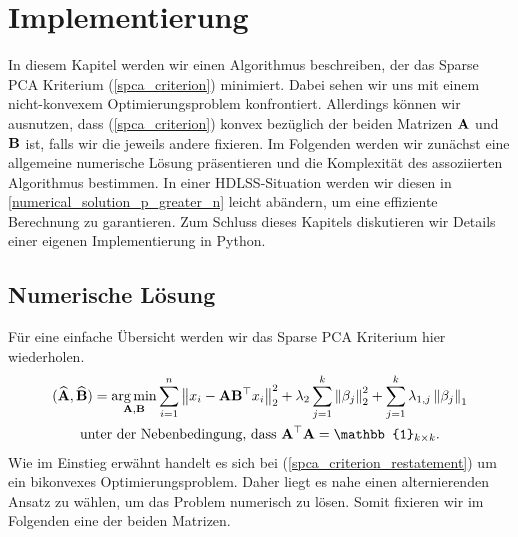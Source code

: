 \chapter{Implementierung}

\label{implementation}

In diesem Kapitel werden wir einen Algorithmus beschreiben, der das Sparse PCA Kriterium (\ref{spca_criterion}) minimiert. Dabei sehen wir uns mit einem nicht-konvexem Optimierungsproblem konfrontiert. Allerdings können wir ausnutzen, dass (\ref{spca_criterion}) konvex bezüglich der beiden Matrizen $\mathbf{A}$ und $\mathbf{B}$ ist, falls wir die jeweils andere fixieren. Im Folgenden werden wir zunächst eine allgemeine numerische Lösung präsentieren und die Komplexität des assoziierten Algorithmus bestimmen. In einer HDLSS-Situation werden wir diesen in \ref{numerical_solution_p_greater_n} leicht abändern, um eine effiziente Berechnung zu garantieren. Zum Schluss dieses Kapitels diskutieren wir Details einer eigenen Implementierung in Python.




\section{Numerische Lösung}
\label{spca_numerical_solution}

Für eine einfache Übersicht werden wir das Sparse PCA Kriterium hier wiederholen.
\begin{align}
\label{spca_criterion_restatement}
\begin{gathered}
(\widehat{\mat{A}}, \widehat{\mat{B}}) = \argmin_{\mat{A}, \mat{B}} \sum_{i=1}^{n} \norm{x_i - \mat{A}\mat{B}^{\top}x_i}_2^2 + \lambda_2 \sum_{j=1}^{k}\norm{\beta_j}_2^2 + \sum_{j=1}^k \lambda_{1,j} \norm{\beta_j}_1\\
\text{unter der Nebenbedingung, dass } \mat{A}^{\top}\mat{A} = \mat{\mathbb{1}}_{k \times k}.
\end{gathered}
\end{align}
Wie im Einstieg erwähnt handelt es sich bei (\ref{spca_criterion_restatement}) um ein bikonvexes Optimierungsproblem. Daher liegt es nahe einen alternierenden Ansatz zu wählen, um das Problem numerisch zu lösen. Somit fixieren wir im Folgenden eine der beiden Matrizen.

